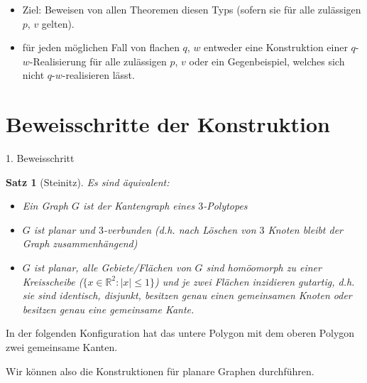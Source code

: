 \documentclass[10pt, notheorems]{beamer}
\newtheorem{theorem}{Satz}[section]
\newcommand{\set}[1]{\{ #1 \}}
\newcommand{\reals}{\mathbb{R}}
\newcommand{\hdef}[1]{\textcolor{darkred2}{#1}}
\begin{document}
\begin{frame}
  \begin{itemize}
  \item Ziel: Beweisen von allen Theoremen diesen Typs (sofern sie für alle zulässigen $p$, $v$ gelten).
    \pause
  \item für jeden möglichen Fall von flachen $q$, $w$ entweder eine Konstruktion einer $q$-$w$-Realisierung für alle zulässigen $p$, $v$ oder ein Gegenbeispiel, welches sich nicht $q$-$w$-realisieren lässt.
  \end{itemize}
\end{frame}

\section{Beweisschritte der Konstruktion}

\begin{frame}{1. Beweisschritt}
  \begin{theorem}[{\sc Steinitz}]
    Es sind äquivalent:
    \begin{itemize}
    \item Ein Graph $G$ ist der Kantengraph eines $3$-Polytopes
    \item $G$ ist planar und $3$-verbunden (d.h. nach Löschen von $3$ Knoten bleibt der Graph zusammenhängend)
    \item $G$ ist planar, alle Gebiete/Flächen von $G$ sind homöomorph zu einer Kreisscheibe ($\set{x \in \reals^2 : |x| \leq 1}$) und je zwei Flächen \hdef{inzidieren gutartig}, d.h. sie sind identisch, disjunkt, besitzen genau einen gemeinsamen Knoten oder besitzen genau eine gemeinsame Kante.
    \end{itemize}
  \end{theorem}
  \pause
  \begin{example}
    In der folgenden Konfiguration hat das untere Polygon mit dem oberen Polygon zwei gemeinsame Kanten.
    
    { \centering
      \par
    }
  \end{example}
  
  Wir können also die Konstruktionen für planare Graphen durchführen.

\end{frame}
\end{document}
